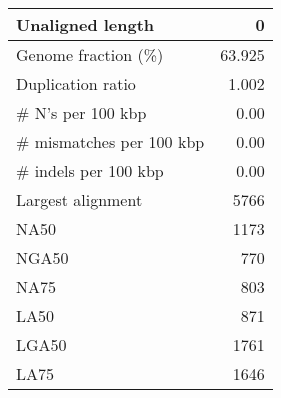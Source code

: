 \documentclass[12pt,a4paper]{article}
\begin{document}
\begin{table}[ht]
\begin{center}
\begin{tabular}{|l*{1}{|r}|}
Unaligned length & 0 \\ \hline
Genome fraction (\%) & 63.925 \\ \hline
Duplication ratio & 1.002 \\ \hline
\# N's per 100 kbp & 0.00 \\ \hline
\# mismatches per 100 kbp & 0.00 \\ \hline
\# indels per 100 kbp & 0.00 \\ \hline
Largest alignment & 5766 \\ \hline
NA50 & 1173 \\ \hline
NGA50 & 770 \\ \hline
NA75 & 803 \\ \hline
LA50 & 871 \\ \hline
LGA50 & 1761 \\ \hline
LA75 & 1646 \\ \hline
\end{tabular}
\end{center}
\end{table}
\end{document}
